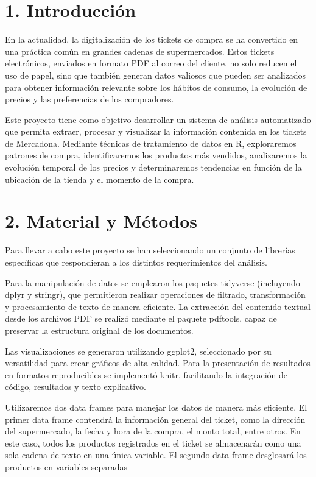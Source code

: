 \documentclass[,,,oneauthor,pdftex]{Definitions/mdpi}
\begin{document}

\hypertarget{introducciuxf3n}{%
\section{1. Introducción}\label{introducciuxf3n}}

En la actualidad, la digitalización de los tickets de compra se ha
convertido en una práctica común en grandes cadenas de supermercados.
Estos tickets electrónicos, enviados en formato PDF al correo del
cliente, no solo reducen el uso de papel, sino que también generan datos
valiosos que pueden ser analizados para obtener información relevante
sobre los hábitos de consumo, la evolución de precios y las preferencias
de los compradores.

Este proyecto tiene como objetivo desarrollar un sistema de análisis
automatizado que permita extraer, procesar y visualizar la información
contenida en los tickets de Mercadona. Mediante técnicas de tratamiento
de datos en R, exploraremos patrones de compra, identificaremos los
productos más vendidos, analizaremos la evolución temporal de los
precios y determinaremos tendencias en función de la ubicación de la
tienda y el momento de la compra.

\hypertarget{material-y-muxe9todos}{%
\section{2. Material y Métodos}\label{material-y-muxe9todos}}

Para llevar a cabo este proyecto se han seleccionando un conjunto de
librerías específicas que respondieran a los distintos requerimientos
del análisis.

Para la manipulación de datos se emplearon los paquetes tidyverse
(incluyendo dplyr y stringr), que permitieron realizar operaciones de
filtrado, transformación y procesamiento de texto de manera eficiente.
La extracción del contenido textual desde los archivos PDF se realizó
mediante el paquete pdftools, capaz de preservar la estructura original
de los documentos.

Las visualizaciones se generaron utilizando ggplot2, seleccionado por su
versatilidad para crear gráficos de alta calidad. Para la presentación
de resultados en formatos reproducibles se implementó knitr, facilitando
la integración de código, resultados y texto explicativo.

Utilizaremos dos data frames para manejar los datos de manera más
eficiente. El primer data frame contendrá la información general del
ticket, como la dirección del supermercado, la fecha y hora de la
compra, el monto total, entre otros. En este caso, todos los productos
registrados en el ticket se almacenarán como una sola cadena de texto en
una única variable. El segundo data frame desglosará los productos en
variables separadas
\end{document}
